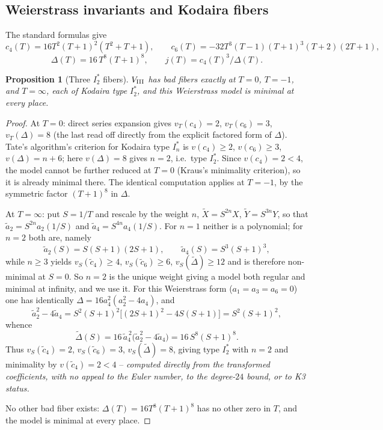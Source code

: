 \documentclass[11pt]{amsart}
\newtheorem{proposition}[theorem]{Proposition}
\theoremstyle{definition}
\begin{document}
\subsection{Weierstrass invariants and Kodaira fibers}

The standard formulas give
\[
c_4(T) = 16T^2(T+1)^2(T^2+T+1),\qquad
c_6(T) = -32T^3(T-1)(T+1)^3(T+2)(2T+1),
\]
\[
\Delta(T) = 16\,T^8(T+1)^8,\qquad j(T)=c_4(T)^3/\Delta(T).
\]

\begin{proposition}[Three $I_2^*$ fibers]
\label{prop:fibers}
$V_{\rm III}$ has bad fibers exactly at $T=0$, $T=-1$, and $T=\infty$,
each of Kodaira type $I_2^*$, and this Weierstrass model is minimal at
every place.
\end{proposition}

\begin{proof}
At $T=0$: direct series expansion gives $v_T(c_4)=2$, $v_T(c_6)=3$,
$v_T(\Delta)=8$ (the last read off directly from the explicit factored
form of $\Delta$). Tate's algorithm's criterion for Kodaira type $I_n^*$
is $v(c_4)\geq2$, $v(c_6)\geq3$, $v(\Delta)=n+6$; here $v(\Delta)=8$ gives
$n=2$, i.e.\ type $I_2^*$. Since $v(c_4)=2<4$, the model cannot be
further reduced at $T=0$ (Kraus's minimality criterion), so it is already
minimal there. The identical computation applies at $T=-1$, by the
symmetric factor $(T+1)^8$ in $\Delta$.

At $T=\infty$: put $S=1/T$ and rescale by the weight $n$, $\tilde
X=S^{2n}X$, $\tilde Y=S^{3n}Y$, so that $\tilde a_2=S^{2n}a_2(1/S)$ and
$\tilde a_4=S^{4n}a_4(1/S)$. For $n=1$ neither is a polynomial; for
$n=2$ both are, namely
\[
\tilde a_2(S)=S(S+1)(2S+1),\qquad \tilde a_4(S)=S^3(S+1)^3,
\]
while $n\geq3$ yields $v_S(\tilde c_4)\geq4$, $v_S(\tilde c_6)\geq6$,
$v_S(\tilde\Delta)\geq12$ and is therefore non-minimal at $S=0$. So
$n=2$ is the unique weight giving a model both regular and minimal at
infinity, and we use it. For this Weierstrass form ($a_1=a_3=a_6=0$) one
has identically $\Delta=16a_4^2(a_2^2-4a_4)$, and
\[
\tilde a_2^2-4\tilde a_4 = S^2(S+1)^2\bigl[(2S+1)^2-4S(S+1)\bigr]=S^2(S+1)^2,
\]
whence
\[
\tilde\Delta(S)=16\,\tilde a_4^{\,2}\bigl(\tilde a_2^2-4\tilde a_4\bigr)
 =16\,S^8(S+1)^8 .
\]
Thus $v_S(\tilde c_4)=2$, $v_S(\tilde c_6)=3$, $v_S(\tilde\Delta)=8$,
giving type $I_2^*$ with $n=2$ and minimality by $v(\tilde c_4)=2<4$ --
\emph{computed directly from the transformed coefficients, with no appeal
to the Euler number, to the degree-$24$ bound, or to K3 status.}

No other bad fiber exists: $\Delta(T)=16T^8(T+1)^8$ has no other zero in
$T$, and the model is minimal at every place.
\end{proof}
\end{document}
